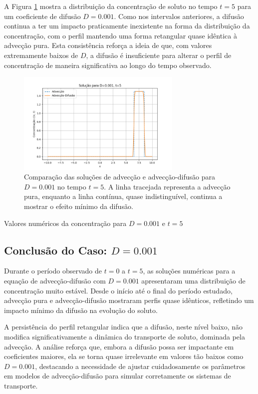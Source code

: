 A Figura \ref{fig:advec_diffus_0.001_t5} mostra a distribuição da concentração de soluto no tempo \( t = 5 \) para um coeficiente de difusão \( D = 0.001 \). Como nos intervalos anteriores, a difusão continua a ter um impacto praticamente inexistente na forma da distribuição da concentração, com o perfil mantendo uma forma retangular quase idêntica à advecção pura. Esta consistência reforça a ideia de que, com valores extremamente baixos de \( D \), a difusão é insuficiente para alterar o perfil de concentração de maneira significativa ao longo do tempo observado.

\begin{figure}[H]
    \centering
    \includegraphics[width=0.7\textwidth]{code/plot/Advec_Difus_t5_D0.001.png}
    \caption{Comparação das soluções de advecção e advecção-difusão para \( D = 0.001 \) no tempo \( t = 5 \). A linha tracejada representa a advecção pura, enquanto a linha contínua, quase indistinguível, continua a mostrar o efeito mínimo da difusão.}
    \label{fig:advec_diffus_0.001_t5}
\end{figure}

\begin{table}[H]
    \centering
    \caption{Valores numéricos da concentração para \( D = 0.001 \) e \( t = 5 \)}
    
\end{table}


\subsection{Conclusão do Caso: \( D = 0.001 \)}
Durante o período observado de \( t = 0 \) a \( t = 5 \), as soluções numéricas para a equação de advecção-difusão com \( D = 0.001 \) apresentaram uma distribuição de concentração muito estável. Desde o início até o final do período estudado, advecção pura e advecção-difusão mostraram perfis quase idênticos, refletindo um impacto mínimo da difusão na evolução do soluto.

A persistência do perfil retangular indica que a difusão, neste nível baixo, não modifica significativamente a dinâmica do transporte de soluto, dominada pela advecção. A análise reforça que, embora a difusão possa ser impactante em coeficientes maiores, ela se torna quase irrelevante em valores tão baixos como \( D = 0.001 \), destacando a necessidade de ajustar cuidadosamente os parâmetros em modelos de advecção-difusão para simular corretamente os sistemas de transporte.
